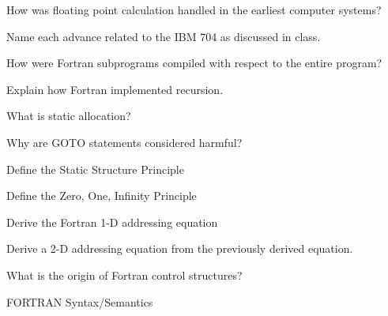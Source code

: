 \documentclass{exam} %
\begin{document}
\begin{questions}
  \question How was floating point calculation handled in the earliest computer systems?

  \question Name each advance related to the IBM 704 as discussed in class.

  \question How were Fortran subprograms compiled with respect to the entire program?

  \question Explain how Fortran implemented recursion.

  \question What is static allocation?

  \question Why are GOTO statements considered harmful?

  \question Define the Static Structure Principle

  \question Define the Zero, One, Infinity Principle

  \question Derive the Fortran 1-D addressing equation

  \question Derive a 2-D addressing equation from the previously derived equation.

  \question What is the origin of Fortran control structures?

  \pagebreak

  \question FORTRAN Syntax/Semantics
\end{questions}
\end{document}
